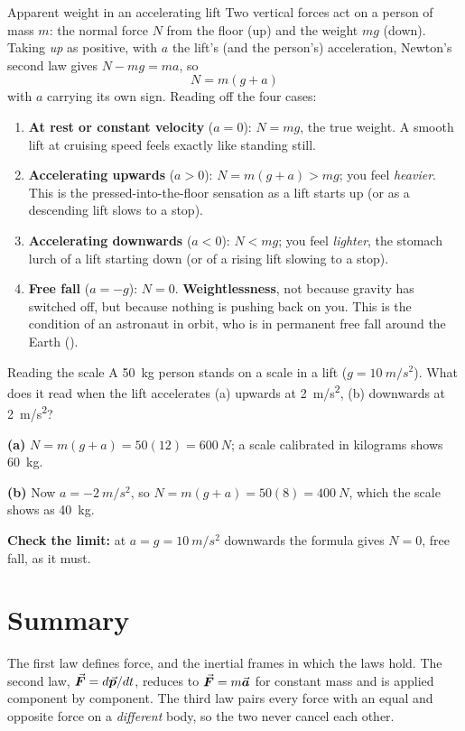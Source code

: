 \begin{derivbox}{Apparent weight in an accelerating lift}
Two vertical forces act on a person of mass $m$: the normal force $N$ from the floor (up) and the weight
$mg$ (down). Taking \emph{up} as positive, with $a$ the lift's (and the person's) acceleration, Newton's
second law gives
$N-mg=ma$, so
\[
\boxed{\;N=m(g+a)\;}
\]
with $a$ carrying its own sign. Reading off the four cases:
\begin{enumerate}
\item \textbf{At rest or constant velocity} ($a=0$): $N=mg$, the true weight. A smooth lift at
      cruising speed feels exactly like standing still.
\item \textbf{Accelerating upwards} ($a>0$): $N=m(g+a)>mg$; you feel \emph{heavier}. This is the
      pressed-into-the-floor sensation as a lift starts up (or as a descending lift slows to a stop).
\item \textbf{Accelerating downwards} ($a<0$): $N<mg$; you feel \emph{lighter}, the stomach lurch of a
      lift starting down (or of a rising lift slowing to a stop).
\item \textbf{Free fall} ($a=-g$): $N=0$. \textbf{Weightlessness}, not because gravity has switched
      off, but because nothing is pushing back on you. This is the condition of an astronaut in orbit,
      who is in permanent free fall around the Earth ().
\end{enumerate}
\end{derivbox}

\begin{exbox}{Reading the scale}
A \SI{50}{kg} person stands on a scale in a lift ($g=\SI{10}{m/s^2}$). What does it read when the lift
accelerates (a) upwards at \SI{2}{m/s^2}, (b) downwards at \SI{2}{m/s^2}?

 \textbf{(a)} $N=m(g+a)=50(12)=\SI{600}{N}$; a scale calibrated in kilograms shows
\SI{60}{kg}.

 \textbf{(b)} Now $a=\SI{-2}{m/s^2}$, so $N=m(g+a)=50(8)=\SI{400}{N}$, which the scale shows
as \SI{40}{kg}.

 \textbf{Check the limit:} at $a=g=\SI{10}{m/s^2}$ downwards the formula gives $N=0$, free
fall, as it must. 
\end{exbox}

\section{Summary}\label{sec:summary7}
The first law defines force, and the inertial frames in which the laws hold. The second law,
$\vec{\bm{F}}=d\vec{\bm{p}}/dt$, reduces to $\vec{\bm{F}}=m\vec{\bm{a}}$ for constant mass and is applied component by component. The third
law pairs every force with an equal and opposite force on a \emph{different} body, so the two never
cancel each other.

